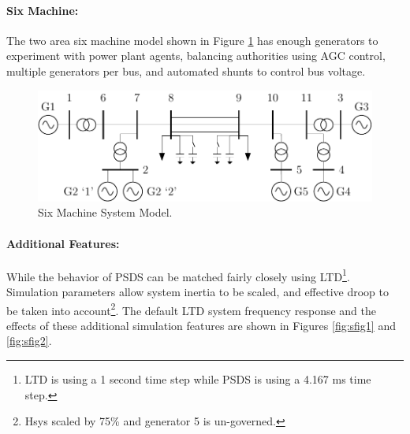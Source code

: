 \documentclass[12pt]{article}
\begin{document}
\pagebreak
\paragraph{Six Machine:} The two area six machine model shown in Figure \ref{system} has enough generators to experiment with power plant agents, balancing authorities using AGC control, multiple generators per bus, and automated shunts to control bus voltage.

\newcommand{\figW}{1}
\begin{figure}[h!]
	\centering
	\includegraphics[width=\figW\linewidth]{../../models/sixMachine/sixMachine}\vspace{-.5em}
	\caption{Six Machine System Model.}
	\label{system}		 
\end{figure}%

\paragraph{Additional Features:} While the behavior of PSDS can be matched fairly closely using LTD\footnote{LTD is using a 1 second time step while PSDS is using a 4.167 ms time step.}. Simulation parameters allow system inertia to be scaled, and effective droop to be taken into account\footnote{Hsys scaled by 75\% and generator 5 is un-governed.}. The default LTD system frequency response and the effects of these additional simulation features are shown in Figures \ref{fig:sfig1} and \ref{fig:sfig2}. 
\end{document}
